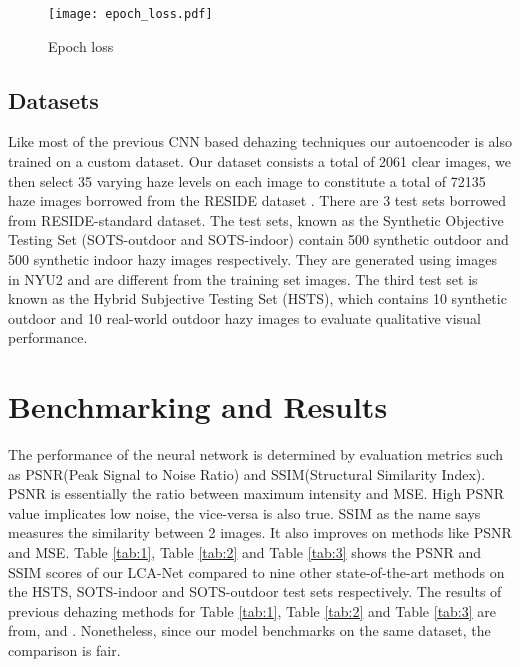 \documentclass[conference]{IEEEtran}
\begin{document}
\begin{figure}[ht]
\centering
\captionsetup{justification=centering}
\centerline{\texttt{[image: epoch\_loss.pdf]}}
\caption{Epoch loss} 
\label{fig:loss}
\end{figure} 

\subsection{    Datasets}
Like most of the previous CNN based dehazing techniques our autoencoder is also trained on a custom dataset. Our dataset consists a total of 2061 clear images, we then select 35 varying haze levels on each image to constitute a total of 72135 haze images borrowed from the RESIDE dataset \cite{li2019benchmarking}.
\newline
There are 3 test sets borrowed from RESIDE-standard \cite{li2019benchmarking} dataset. The test sets, known as the Synthetic Objective Testing Set (SOTS-outdoor and SOTS-indoor) contain 500 synthetic outdoor and 500 synthetic indoor hazy images respectively. They are generated using images in NYU2 and are different from the training set images. The third test set is known as the Hybrid Subjective Testing Set (HSTS), which contains 10 synthetic outdoor and 10 real-world outdoor hazy images to evaluate qualitative visual performance.
\newline

\section{Benchmarking and Results}
The performance of the neural network is determined by evaluation metrics such as PSNR(Peak Signal to Noise Ratio) and SSIM(Structural Similarity Index). PSNR is essentially the ratio between maximum intensity and MSE. High PSNR value implicates low noise, the vice-versa is also true. 
SSIM as the name says measures the similarity between 2 images. It also improves on methods like PSNR and MSE.
\newline
\newline
Table \ref{tab:1}, Table \ref{tab:2} and Table \ref{tab:3} shows the PSNR and SSIM scores of our LCA-Net compared to nine other state-of-the-art methods \cite{5567108, 5459251, Meng_2013_ICCV, 10.1007/978-3-319-46475-6_36, Berman_2016_CVPR, 7539399, 10.1007/978-3-319-46475-6_10, Li_2017_ICCV, 8803478} on the HSTS, SOTS-indoor and SOTS-outdoor test sets respectively. The results of previous dehazing methods for Table \ref{tab:1}, Table \ref{tab:2} and Table \ref{tab:3} are from, \cite{li2019benchmarking} and \cite{8803478}. Nonetheless, since our model benchmarks on the same dataset, the comparison is fair.
\newline
\end{document}
